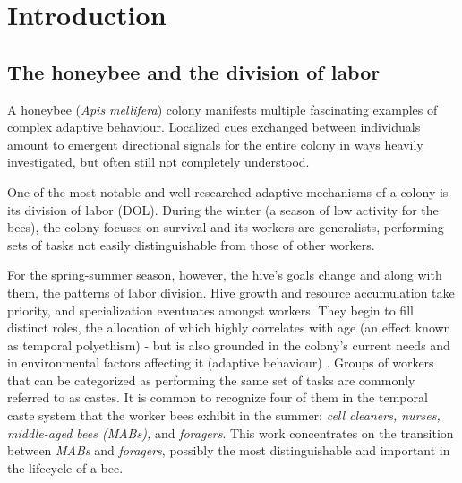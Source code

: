 
\chapter{Introduction}  %

\ifpdf
    \graphicspath{{Chapters/Chapter1/Figs/Raster/}{Chapters/Chapter1/Figs/PDF/}{Chapters/Chapter1/Figs/}}
\else
    \graphicspath{{Chapters/Chapter1/Figs/Vector/}{Chapters/Chapter1/Figs/}}
\fi


\section{The honeybee and the division of labor} %
A honeybee (\textit{Apis mellifera}) colony manifests multiple fascinating examples of complex adaptive behaviour. 
Localized cues exchanged between individuals amount to emergent directional signals for the entire colony 
in ways heavily investigated, but often still not completely understood. 

One of the most notable and well-researched adaptive mechanisms of a colony is its division of labor (DOL). 
During the winter (a season of low activity for the bees), the colony focuses on survival 
and its workers are generalists, performing sets of tasks not easily distinguishable from those of other workers. 

For the spring-summer season, however, the hive’s goals change and along with them, the patterns of labor division. 
Hive growth and resource accumulation take priority, and specialization eventuates amongst workers. 
They begin to fill distinct roles, the allocation of which highly correlates with age (an effect 
known as temporal polyethism) - but is also grounded in the colony’s current needs and in environmental 
factors affecting it (adaptive behaviour) \citep{seeley_adaptive_1982}. Groups of workers that can be 
categorized as performing the same set of tasks are commonly referred to as castes. It is common to recognize 
four of them in the temporal caste system that the worker bees exhibit in the summer:
\textit{cell cleaners, nurses, middle-aged bees (MABs),} and \textit{foragers}. 
This work concentrates on the transition between \textit{MABs} and \textit{foragers}, 
possibly the most distinguishable and important in the lifecycle of a bee.


